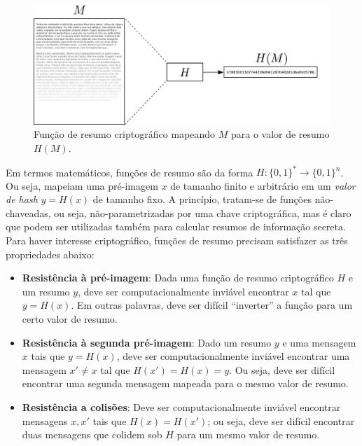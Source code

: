 \documentclass{SBCbookchapter}
\begin{document}
\begin{figure}[htbp]
\begin{center}
    \includegraphics[scale=0.25]{figures/hash.pdf}
    \caption{Função de resumo criptográfico mapeando $M$ para o valor de resumo $H(M)$.}
    \label{fig:hash}
\end{center}
\end{figure}

Em termos matemáticos, funções de resumo são da forma $H : \{0,1\}^* \rightarrow \{0,1\}^n$. Ou seja, mapeiam uma pré-imagem $x$ de tamanho finito e arbitrário em um \emph{valor de hash} $y = H(x)$ de tamanho fixo. A princípio, tratam-se de funções não-chaveadas, ou seja, não-parametrizadas por uma chave criptográfica, mas é claro que podem ser utilizadas também para calcular resumos de informação secreta. Para haver interesse criptográfico, funções de resumo precisam satisfazer as três propriedades abaixo:

\begin{itemize}
 \item {\bf Resistência à pré-imagem}: Dada uma função de resumo criptográfico $H$ e um resumo $y$, deve ser computacionalmente inviável encontrar $x$ tal que $y = H(x)$. Em outras palavras, deve ser difícil ``inverter'' a função para um certo valor de resumo.
 \item {\bf Resistência à segunda pré-imagem}: Dado um resumo $y$ e uma mensagem $x$ tais que $y = H(x)$, deve ser computacionalmente inviável encontrar uma mensagem $x' \neq x$ tal que $H(x') = H(x) = y$. Ou seja, deve ser difícil encontrar uma segunda mensagem mapeada para o mesmo valor de resumo.
 \item {\bf Resistência a colisões}: Deve ser computacionalmente inviável encontrar mensagens $x, x'$ tais que $H(x) = H(x')$; ou seja, deve ser difícil encontrar duas mensagens que colidem sob $H$ para um mesmo valor de resumo.
\end{itemize}
\end{document}

